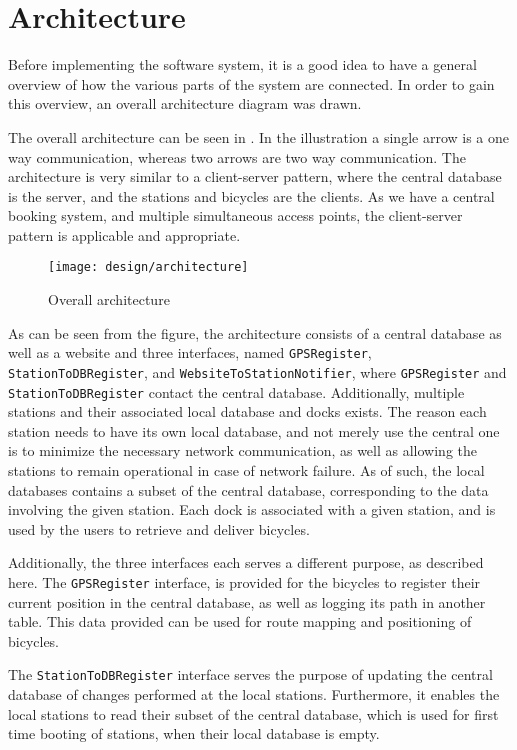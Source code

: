 \section{Architecture}\label{sec:architecture}
Before implementing the software system, it is a good idea to have a general overview of how the various parts of the system are connected.
In order to gain this overview, an overall architecture diagram was drawn.

The overall architecture can be seen in .
In the illustration a single arrow is a one way communication, whereas two arrows are two way communication.
The architecture is very similar to a client-server pattern, where the central database is the server, and the stations and bicycles are the clients.
As we have a central booking system, and multiple simultaneous access points, the client-server pattern is applicable and appropriate.

\begin{figure}[h]
	\centering
	\texttt{[image: design/architecture]}
	\caption{Overall architecture}\label{fig:overallarch}
\end{figure}

As can be seen from the figure, the architecture consists of a central database as well as a website and three interfaces, named \texttt{GPSRegister}, \texttt{StationToDBRegister}, and \texttt{WebsiteToStationNotifier}, where \texttt{GPSRegister} and \texttt{StationToDBRegister} contact the central database.
Additionally, multiple stations and their associated local database and docks exists.
The reason each station needs to have its own local database, and not merely use the central one is to minimize the necessary network communication, as well as allowing the stations to remain operational in case of network failure.
As of such, the local databases contains a subset of the central database, corresponding to the data involving the given station.
Each dock is associated with a given station, and is used by the users to retrieve and deliver bicycles.

Additionally, the three interfaces each serves a different purpose, as described here.
The \texttt{GPSRegister} interface, is provided for the bicycles to register their current position in the central database, as well as logging its path in another table.
This data provided can be used for route mapping and positioning of bicycles.

The \texttt{StationToDBRegister} interface serves the purpose of updating the central database of changes performed at the local stations. Furthermore, it enables the local stations to read their subset of the central database, which is used for first time booting of stations, when their local database is empty.

